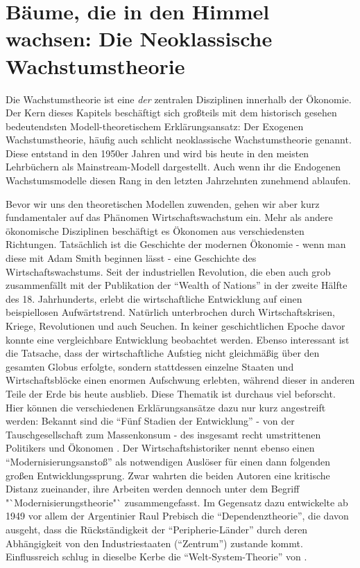 \section{Bäume, die in den Himmel wachsen: Die Neoklassische Wachstumstheorie}
\label{sec: Wachstum}

Die Wachstumstheorie ist eine \textit{der} zentralen Disziplinen innerhalb der Ökonomie. Der Kern dieses Kapitels beschäftigt sich großteils mit dem historisch gesehen bedeutendsten Modell-theoretischem Erklärungsansatz: Der Exogenen Wachstumstheorie, häufig auch schlicht neoklassische Wachstumstheorie genannt. Diese entstand in den 1950er Jahren und wird bis heute in den meisten Lehrbüchern als Mainstream-Modell dargestellt. Auch wenn ihr die Endogenen Wachstumsmodelle diesen Rang in den letzten Jahrzehnten zunehmend ablaufen. 

Bevor wir uns den theoretischen Modellen zuwenden, gehen wir aber kurz fundamentaler auf das Phänomen Wirtschaftswachstum ein. Mehr als andere ökonomische Disziplinen beschäftigt es Ökonomen aus verschiedensten Richtungen. Tatsächlich ist die Geschichte der modernen Ökonomie - wenn man diese mit Adam Smith beginnen lässt - eine Geschichte des Wirtschaftswachstums. Seit der industriellen Revolution, die eben auch grob zusammenfällt mit der Publikation der "`Wealth of Nations"' in der zweite Hälfte des 18. Jahrhunderts, erlebt die wirtschaftliche Entwicklung auf einen beispiellosen Aufwärtstrend. Natürlich unterbrochen durch Wirtschaftskrisen, Kriege, Revolutionen und auch Seuchen. In keiner geschichtlichen Epoche davor konnte eine vergleichbare Entwicklung beobachtet werden. Ebenso interessant ist die Tatsache, dass der wirtschaftliche Aufstieg nicht gleichmäßig über den gesamten Globus erfolgte, sondern stattdessen einzelne Staaten und Wirtschaftsblöcke einen enormen Aufschwung erlebten, während dieser in anderen Teile der Erde bis heute ausblieb. Diese Thematik ist durchaus viel beforscht. Hier können die verschiedenen Erklärungsansätze dazu nur kurz angestreift werden: Bekannt sind die "`Fünf Stadien der Entwicklung"' - von der Tauschgesellschaft zum Massenkonsum - des insgesamt recht umstrittenen Politikers und Ökonomen \textcite{Rostow1960}. Der Wirtschaftshistoriker \textcite{Gerschenkron1962} nennt ebenso einen "`Modernisierungsanstoß"' als notwendigen Auslöser für einen dann folgenden großen Entwicklungssprung. Zwar wahrten die beiden Autoren eine kritische Distanz zueinander, ihre Arbeiten werden dennoch unter dem Begriff "`Modernisierungstheorie"` zusammengefasst. Im Gegensatz dazu entwickelte ab 1949 vor allem der Argentinier Raul Prebisch die "`Dependenztheorie"', die davon ausgeht, dass die Rückständigkeit der "`Peripherie-Länder"' durch deren Abhängigkeit von den Industriestaaten ("`Zentrum"') zustande kommt. Einflussreich schlug in dieselbe Kerbe die "`Welt-System-Theorie"' von \textcite{Wallerstein1974}. 

